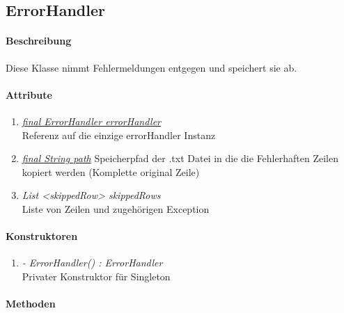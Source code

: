 \subsection{ErrorHandler}

\paragraph{Beschreibung}
Diese Klasse nimmt Fehlermeldungen entgegen und speichert sie ab.

\paragraph{Attribute}

\begin{enumerate}[$\bullet$]
	\item \underline{\textit{final ErrorHandler errorHandler}} \\Referenz auf die einzige errorHandler Instanz
	\item \underline{\textit{final String path}} Speicherpfad der .txt Datei in die die Fehlerhaften Zeilen kopiert werden (Komplette original Zeile)
	\item \textit{List <skippedRow> skippedRows} \\ Liste von Zeilen und zugehörigen Exception
\end{enumerate}

\paragraph{Konstruktoren}
\begin{enumerate}[+]
	\item \textit{ - ErrorHandler() : ErrorHandler}  \\Privater Konstruktor für Singleton
\end{enumerate}

\paragraph{Methoden}

